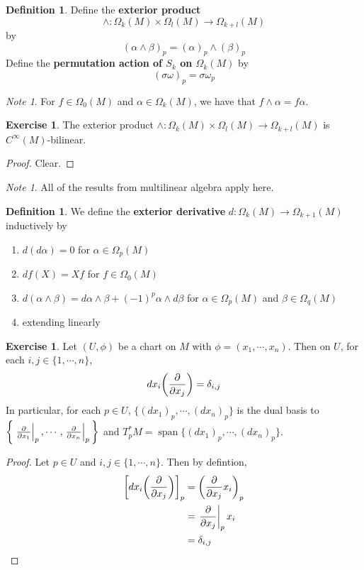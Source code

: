 \documentclass[12pt]{amsart}
\theoremstyle{definition}
\newtheorem{defn}[definition]{Definition}
\theoremstyle{remark}
\newtheorem{note}[remark]{Note}
\theoremstyle{definition}
\newtheorem{ex}[definition]{Exercise}
\newcommand{\al}{\alpha}
\newcommand{\bet}{\beta}
\newcommand{\del}{\delta}
\newcommand{\sig}{\sigma}
\newcommand{\om}{\omega}
\newcommand{\Om}{\Omega}
\DeclareMathOperator{\spn}{span}
\begin{document}
	\begin{defn}
		Define the \textbf{exterior product} $$\wedge: \Om_k(M) \times \Om_l(M) \rightarrow \Om_{k+l}(M) $$ by $$(\al \wedge \beta)_p = (\al)_p \wedge (\beta)_p$$
		Define the \textbf{permutation action of $S_k$ on $\Om_k(M)$} by $$(\sig \om)_p = \sig \om_p$$
	\end{defn}
	
	\begin{note}
		For $f \in \Om_0(M)$ and $\al \in \Om_k(M)$, we have that $f \wedge \al = f \al$.
	\end{note}
	
	\begin{ex}
	The exterior product $\wedge: \Om_k(M) \times \Om_l(M) \rightarrow \Om_{k+l}(M) $ is $C^{\infty}(M)$-bilinear.
	\end{ex}
	
	\begin{proof}
	Clear.
	\end{proof}
	
	\begin{note}
		All of the results from multilinear algebra apply here.
	\end{note}

	\begin{defn}
		We define the \textbf{exterior derivative} $d: \Om_k(M) \rightarrow \Om_{k+1}(M)$ inductively by 
		\begin{enumerate}
			\item $d(d \al) = 0$ for $\al \in \Om_p(M)$
			\item $df(X) = Xf$ for $f \in \Om_0(M)$
			\item $d(\al \wedge \bet) = d\al \wedge \bet + (-1)^p \al \wedge d\bet$ for $\al \in \Om_p(M)$ and $\bet \in \Om_q(M)$
			\item extending linearly
		\end{enumerate}
	\end{defn}

	\begin{ex}
		Let $(U, \phi)$ be a chart on $M$ with $\phi = (x_1, \cdots, x_n)$. Then on $U$, for each $i,j \in \{1, \cdots, n\}$, $$dx_i\bigg(\pdv{x_j} \bigg) = \del_{i,j}$$ 
		In particular, for each $p \in U$, $\{(dx_1)_p, \cdots, (dx_n)_p \}$ is the dual basis to $\bigg \{ \eval{\pdv{x_1}}_{p}, \cdots, \eval{\pdv{x_n}}_{p} \bigg \}$ and $T_p^*M = \spn\{(dx_1)_p, \cdots, (dx_n)_p\}$.
	\end{ex}

	\begin{proof}
		Let $p \in U$ and $i,j \in \{1, \cdots, n\}$. Then  by defintion,
		\begin{align*}
			\bigg[ dx_i \bigg (\pdv{x_j} \bigg ) \bigg]_p 
			&= \bigg( \pdv{x_j} x_i \bigg )_p \\
			&= \eval{\pdv{x_j}}_{p} x_i \\
			&= \del_{i,j} \\
		\end{align*}
	\end{proof}
\end{document}
